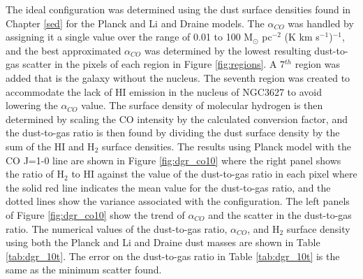The ideal configuration was determined using the dust surface densities found in Chapter \ref{sed} for the Planck and Li and Draine models.  The $\alpha_{CO}$ was handled by assigning it a single value over the range of 0.01 to 100 M$_\odot$ pc$^{-2}$ (K km s$^{-1}$)$^{-1}$, and the best approximated $\alpha_{CO}$ was determined by the lowest resulting dust-to-gas scatter in the pixels of each region in Figure \ref{fig:regions}.  A 7$^{th}$ region was added that is the galaxy without the nucleus.  The seventh region was created to accommodate the lack of HI emission in the nucleus of NGC3627 to avoid lowering the $\alpha_{CO}$ value.  The surface density of molecular hydrogen is then determined by scaling the CO intensity by the calculated conversion factor, and the dust-to-gas ratio is then found by dividing the dust surface density by the sum of the HI and H$_2$ surface densities.  The results using Planck model with the CO J=1-0 line are shown in Figure \ref{fig:dgr_co10} where the right panel shows the ratio of H$_2$ to HI against the value of the dust-to-gas ratio in each pixel where the solid red line indicates the mean value for the dust-to-gas ratio, and the dotted lines show the variance associated with the configuration.  The left panels of Figure \ref{fig:dgr_co10} show the trend of $\alpha_{CO}$ and the scatter in the dust-to-gas ratio.  The numerical values of the dust-to-gas ratio, $\alpha_{CO}$, and H$_2$ surface density using both the Planck and Li and Draine dust masses are shown in Table \ref{tab:dgr_10t}.  The error on the dust-to-gas ratio in Table \ref{tab:dgr_10t} is the same as the minimum scatter found.

